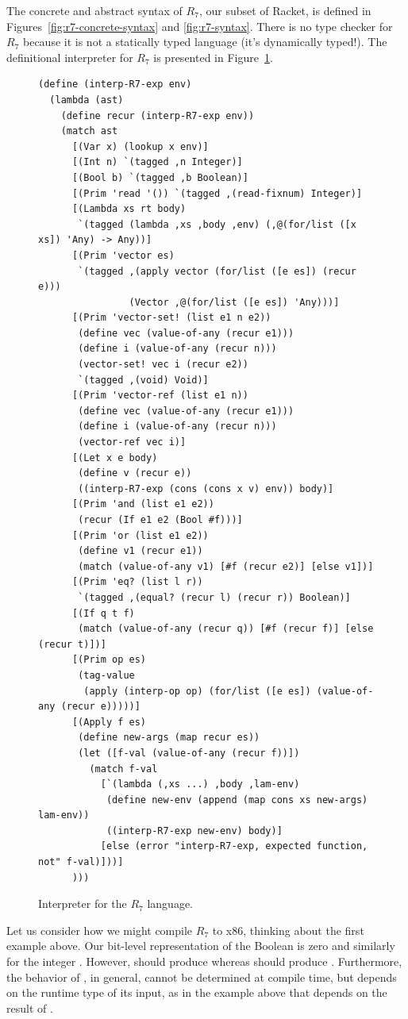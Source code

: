 \documentclass[11pt]{book}
\begin{document}
The concrete and abstract syntax of $R_7$, our subset of Racket, is
defined in Figures~\ref{fig:r7-concrete-syntax} and
\ref{fig:r7-syntax}.
%
There is no type checker for $R_7$ because it is not a statically
typed language (it's dynamically typed!).
%
The definitional interpreter for $R_7$ is presented in
Figure~\ref{fig:interp-R7}.

\begin{figure}[tbp]
\begin{lstlisting}[basicstyle=\ttfamily\footnotesize]
(define (interp-R7-exp env)
  (lambda (ast)
    (define recur (interp-R7-exp env))
    (match ast
      [(Var x) (lookup x env)]
      [(Int n) `(tagged ,n Integer)]
      [(Bool b) `(tagged ,b Boolean)]
      [(Prim 'read '()) `(tagged ,(read-fixnum) Integer)]
      [(Lambda xs rt body)
       `(tagged (lambda ,xs ,body ,env) (,@(for/list ([x xs]) 'Any) -> Any))]
      [(Prim 'vector es)
       `(tagged ,(apply vector (for/list ([e es]) (recur e)))
                (Vector ,@(for/list ([e es]) 'Any)))]
      [(Prim 'vector-set! (list e1 n e2))
       (define vec (value-of-any (recur e1)))
       (define i (value-of-any (recur n)))
       (vector-set! vec i (recur e2))
       `(tagged ,(void) Void)]
      [(Prim 'vector-ref (list e1 n))
       (define vec (value-of-any (recur e1)))
       (define i (value-of-any (recur n)))
       (vector-ref vec i)]
      [(Let x e body)
       (define v (recur e))
       ((interp-R7-exp (cons (cons x v) env)) body)]
      [(Prim 'and (list e1 e2))
       (recur (If e1 e2 (Bool #f)))]
      [(Prim 'or (list e1 e2))
       (define v1 (recur e1))
       (match (value-of-any v1) [#f (recur e2)] [else v1])]
      [(Prim 'eq? (list l r))
       `(tagged ,(equal? (recur l) (recur r)) Boolean)]
      [(If q t f)
       (match (value-of-any (recur q)) [#f (recur f)] [else (recur t)])]
      [(Prim op es)
       (tag-value
        (apply (interp-op op) (for/list ([e es]) (value-of-any (recur e)))))]
      [(Apply f es)
       (define new-args (map recur es))
       (let ([f-val (value-of-any (recur f))])
         (match f-val 
           [`(lambda (,xs ...) ,body ,lam-env)
            (define new-env (append (map cons xs new-args) lam-env))
            ((interp-R7-exp new-env) body)]
           [else (error "interp-R7-exp, expected function, not" f-val)]))]
      )))
\end{lstlisting}
\caption{Interpreter for the $R_7$ language.}
\label{fig:interp-R7}
\end{figure}


Let us consider how we might compile $R_7$ to x86, thinking about the
first example above. Our bit-level representation of the Boolean
 is zero and similarly for the integer .  However,
 should produce  whereas 
should produce . Furthermore, the behavior of , in
general, cannot be determined at compile time, but depends on the
runtime type of its input, as in the example above that depends on the
result of .
\end{document}
